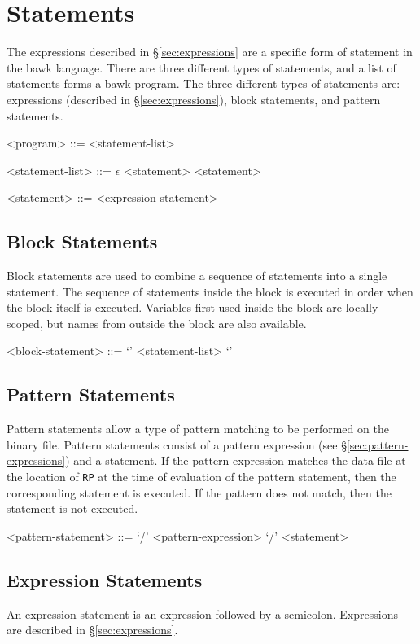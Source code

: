 \section{Statements}
\label{sec:statements}
The expressions described in \S\ref{sec:expressions} are a specific form of statement in the bawk language.  There are three different types of statements, and a list of statements forms a bawk program.  The three different types of statements are: expressions (described in \S\ref{sec:expressions}), block statements, and pattern statements.
\begin{grammar}
<program> ::= <statement-list>

<statement-list> ::= $\epsilon$
\alt <statement>
 <statement>

<statement> ::= <expression-statement>
\end{grammar}

\subsection{Block Statements}
Block statements are used to combine a sequence of statements into a single statement.  The sequence of statements inside the block is executed in order when the block itself is executed.  Variables first used inside the block are locally scoped, but names from outside the block are also available.
\begin{grammar}
<block-statement> ::= `{' <statement-list> `}'
\end{grammar}

\subsection{Pattern Statements}
\label{sec:pattern-statement}
Pattern statements allow a type of pattern matching to be performed on the binary file.  Pattern statements consist of a pattern expression (see \S\ref{sec:pattern-expressions}) and a statement.  If the pattern expression matches the data file at the location of \texttt{RP} at the time of evaluation of the pattern statement, then the corresponding statement is executed.  If the pattern does not match, then the statement is not executed.
\begin{grammar}
<pattern-statement> ::= `/' <pattern-expression> `/' <statement>
\end{grammar}

\subsection{Expression Statements}
An expression statement is an expression followed by a semicolon.  Expressions are described in \S\ref{sec:expressions}.

